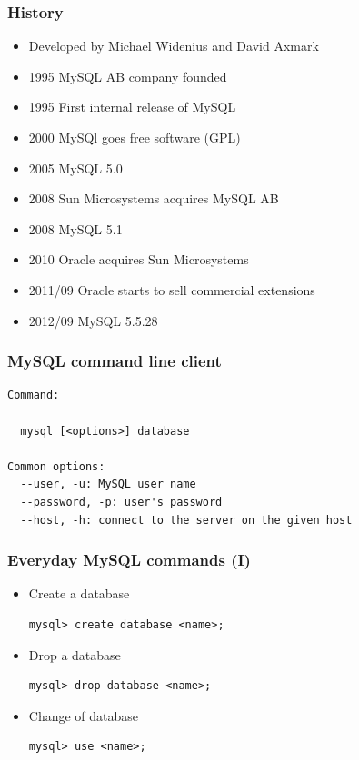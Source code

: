 \documentclass{beamer}
\begin{document}
\begin{frame}
\frametitle{History}

\begin{itemize}
\item Developed by Michael Widenius and David Axmark
\item 1995 MySQL AB company founded
\item 1995 First internal release of MySQL
\item 2000 MySQl goes free software (GPL)
\item 2005 MySQL 5.0
\item 2008 Sun Microsystems acquires MySQL AB
\item 2008 MySQL 5.1
\item 2010 Oracle acquires Sun Microsystems
\item 2011/09 Oracle starts to sell commercial extensions
\item 2012/09 MySQL 5.5.28
\end{itemize}

\end{frame}


\begin{frame}[fragile]
\frametitle{MySQL command line client}

\begin{verbatim}
Command:

  mysql [<options>] database

Common options:
  --user, -u: MySQL user name
  --password, -p: user's password
  --host, -h: connect to the server on the given host
\end{verbatim}

\end{frame}


\begin{frame}[fragile]
\frametitle{Everyday MySQL commands (I)}

\begin{itemize}
\item Create a database
\begin{verbatim}
mysql> create database <name>;

\end{verbatim}

\item Drop a database
\begin{verbatim}
mysql> drop database <name>;

\end{verbatim}

\item Change of database
\begin{verbatim}
mysql> use <name>;

\end{verbatim}
\end{itemize}

\end{frame}
\end{document}
